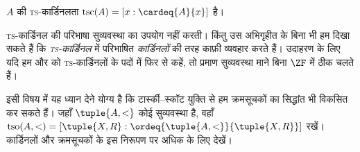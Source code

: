 \documentclass[../../../include/open-logic-section]{subfiles}
\begin{document}
\begin{defn}
$A$ की \textsc{ts}-कार्डिनलता
$\text{tsc}(A)=[x:\cardeq{A}{x}]$ है।
\end{defn}

\textsc{ts}-कार्डिनल की परिभाषा सुव्यवस्था का उपयोग नहीं करती। किंतु उस
अभिगृहीत के बिना भी हम दिखा सकते हैं कि \emph{\textsc{ts}-कार्डिनल}
 में परिभाषित
\emph{कार्डिनलों} की तरह काफ़ी व्यवहार करते हैं। उदाहरण के लिए यदि हम
 और
 को
\textsc{ts}-कार्डिनलों के पदों में फिर से कहें, तो प्रमाण सुव्यवस्था माने
बिना $\ZF$ में ठीक चलते हैं।

इसी विषय में यह ध्यान देने योग्य है कि टार्स्की--स्कॉट युक्ति से हम
क्रमसूचकों का सिद्धांत भी विकसित कर सकते हैं। जहाँ $\tuple{A,<}$ कोई
सुव्यवस्था है, वहाँ
$\text{tso}(A,<)=[\tuple{X,R}:\ordeq{\tuple{A,<}}{\tuple{X,R}}]$ रखें।
कार्डिनलों और क्रमसूचकों के इस निरूपण पर अधिक के लिए
\citet[chs.~9--12]{Potter2004} देखें।
\end{document}
